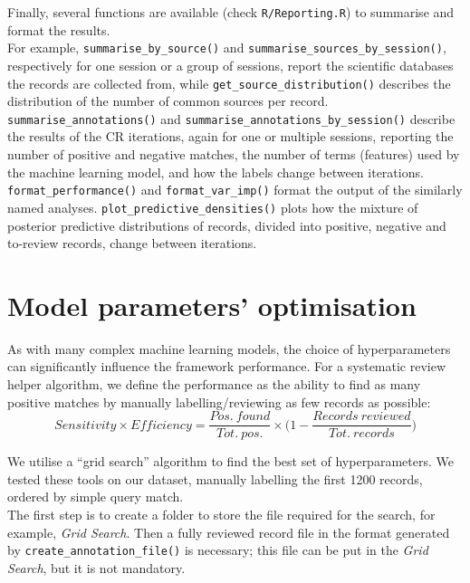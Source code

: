 \documentclass[
]{article}
\begin{document}
Finally, several functions are available (check \texttt{R/Reporting.R})
to summarise and format the results.\\
For example, \texttt{summarise\_by\_source()} and
\texttt{summarise\_sources\_by\_session()}, respectively for one session
or a group of sessions, report the scientific databases the records are
collected from, while \texttt{get\_source\_distribution()} describes the
distribution of the number of common sources per record.\\
\texttt{summarise\_annotations()} and
\texttt{summarise\_annotations\_by\_session()} describe the results of
the CR iterations, again for one or multiple sessions, reporting the
number of positive and negative matches, the number of terms (features)
used by the machine learning model, and how the labels change between
iterations. \texttt{format\_performance()} and
\texttt{format\_var\_imp()} format the output of the similarly named
analyses. \texttt{plot\_predictive\_densities()} plots how the mixture
of posterior predictive distributions of records, divided into positive,
negative and to-review records, change between iterations.

\hypertarget{model-parameters-optimisation}{%
\section{Model parameters'
optimisation}\label{model-parameters-optimisation}}

As with many complex machine learning models, the choice of
hyperparameters can significantly influence the framework performance.
For a systematic review helper algorithm, we define the performance as
the ability to find as many positive matches by manually
labelling/reviewing as few records as possible:\\

\[
Sensitivity \times Efficiency =
\frac{Pos.\ found}{Tot.\ pos.} \times \bigg(1 - \frac{Records\ reviewed}{Tot.\ records}\bigg)
\]

We utilise a ``grid search'' algorithm to find the best set of
hyperparameters. We tested these tools on our dataset, manually
labelling the first 1200 records, ordered by simple query match.\\
The first step is to create a folder to store the file required for the
search, for example, \emph{Grid Search}. Then a fully reviewed record
file in the format generated by \texttt{create\_annotation\_file()} is
necessary; this file can be put in the \emph{Grid Search}, but it is not
mandatory.\\
\end{document}

